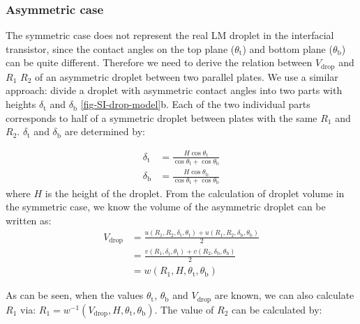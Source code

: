 \subsubsection*{Asymmetric case}
\label{sec:small-orgba3824f}
The symmetric case does not represent the real LM droplet in the
interfacial transistor, since the contact angles on the top plane
(\(\theta_{\mathrm{t}}\)) and bottom plane (\(\theta_{\mathrm{b}}\))
can be quite different. Therefore we need to derive the relation
between \(V_{\mathrm{drop}}\) and \(R_{1}\) \(R_{2}\) of an asymmetric
droplet between two parallel plates. We use a similar approach:
divide a droplet with asymmetric contact angles into two parts with
heights \(\delta_{\mathrm{t}}\) and \(\delta_{\mathrm{b}}\)
\autoref{fig-SI-drop-model}b. Each of the two individual parts
corresponds to half of a symmetric droplet between plates with the
same \(R_{1}\) and \(R_{2}\). \(\delta_{\mathrm{t}}\) and
\(\delta_{\mathrm{b}}\) are determined by:

\begin{eqnarray}
\label{eq:small-deltas-1}
\delta_{\mathrm{t}} &= {\displaystyle \frac{H \cos \theta_{\mathrm{t}}}{\cos \theta_{\mathrm{t}} 
                  + \cos \theta_{\mathrm{b}}}} \\
\label{eq:small-deltas-2}
\delta_{\mathrm{b}} &= {\displaystyle \frac{H \cos \theta_{\mathrm{b}}}{\cos \theta_{\mathrm{t}} 
                  + \cos \theta_{\mathrm{b}}}}
\end{eqnarray}
where \(H\) is the height of the droplet.
From the calculation of droplet volume in the symmetric case, we know
the volume of the asymmetric droplet can be written as:
\begin{equation}
\label{eq:small-V-assym-1}
\begin{aligned}
V_{\mathrm{drop}} &= \frac{u(R_{1}, R_{2}, \delta_{\mathrm{t}}, \theta_{\mathrm{t}}) + u(R_{1}, R_{2}, \delta_{\mathrm{b}}, \theta_{\mathrm{b}})}{2}\\
                  &= \frac{v(R_{1}, \delta_{\mathrm{t}}, \theta_{\mathrm{t}}) +
                           v(R_{2}, \delta_{\mathrm{b}}, \theta_{\mathrm{b}})}{2} \\
                  &= w(R_{1}, H, \theta_{\mathrm{t}}, \theta_{\mathrm{b}})
\end{aligned}
\end{equation}

As can be seen, when the values \(\theta_{\mathrm{t}}\),
\(\theta_{\mathrm{b}}\) and \(V_{\mathrm{drop}}\) are known, we can also
calculate \(R_{1}\) via: \(R_{1} = w^{-1}(V_{\mathrm{drop}}, H,
 \theta_{\mathrm{t}}, \theta_{\mathrm{b}})\). The value of \(R_{2}\) can
be calculated by:

